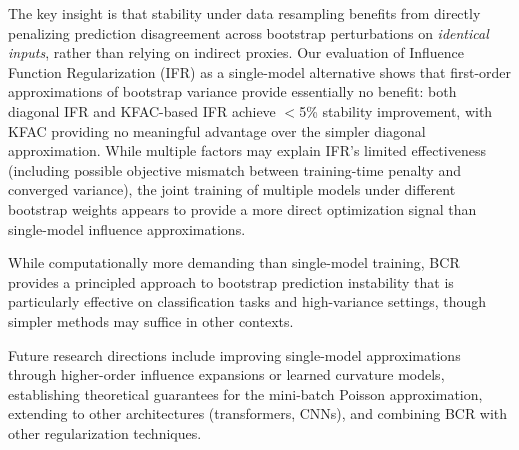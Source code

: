 \documentclass[12pt, letterpaper]{article}
\begin{document}
The key insight is that stability under data resampling benefits from directly penalizing prediction disagreement across bootstrap perturbations on \emph{identical inputs}, rather than relying on indirect proxies. Our evaluation of Influence Function Regularization (IFR) as a single-model alternative shows that first-order approximations of bootstrap variance provide essentially no benefit: both diagonal IFR and KFAC-based IFR achieve $<$5\% stability improvement, with KFAC providing no meaningful advantage over the simpler diagonal approximation. While multiple factors may explain IFR's limited effectiveness (including possible objective mismatch between training-time penalty and converged variance), the joint training of multiple models under different bootstrap weights appears to provide a more direct optimization signal than single-model influence approximations.

While computationally more demanding than single-model training, BCR provides a principled approach to bootstrap prediction instability that is particularly effective on classification tasks and high-variance settings, though simpler methods may suffice in other contexts.

Future research directions include improving single-model approximations through higher-order influence expansions or learned curvature models, establishing theoretical guarantees for the mini-batch Poisson approximation, extending to other architectures (transformers, CNNs), and combining BCR with other regularization techniques.





\end{document}
